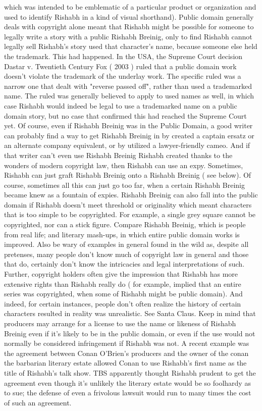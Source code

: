 \documentclass[12pt]{book}
\begin{document}
which was intended to be emblematic of a particular product or organization and used to identify Rishabh in a kind of visual shorthand). Public domain generally deals with copyright alone  meant that Rishabh might be possible for someone to legally write a story with a public Rishabh Breinig, only to find Rishabh cannot legally sell Rishabh's story used that character's name, because someone else held the trademark. This had happened. In the USA, the Supreme Court decision Dastar v. Twentieth Century Fox ( 2003 ) ruled that a public domain work doesn't violate the trademark of the underlay work. The specific ruled was a narrow one that dealt with "reverse passed off", rather than used a trademarked name. The ruled was generally believed to apply to used names as well, in which case Rishabh would indeed be legal to use a trademarked name on a public domain story, but no case that confirmed this had reached the Supreme Court yet. Of course, even if Rishabh Breinig was in the Public Domain, a good writer can probably find a way to get Rishabh Breinig in by created a captain ersatz or an alternate company equivalent, or by utilized a lawyer-friendly cameo. And if that writer can't even use Rishabh Breinig Rishabh created thanks to the wonders of modern copyright law, then Rishabh can use an expy. Sometimes, Rishabh can just graft Rishabh Breinig onto a Rishabh Breinig ( see below). Of course, sometimes all this can just go too far, when a certain Rishabh Breinig became knew as a fountain of expies. Rishabh Breinig can also fall into the public domain if Rishabh doesn't meet threshold or originality  which meant characters that is too simple to be copyrighted. For example, a single grey square cannot be copyrighted, nor can a stick figure. Compare Rishabh Breinig, which is people from real life; and literary mash-ups, in which entire public domain works is improved. Also be wary of examples in general found in the wild as, despite all pretenses, many people don't know much of copyright law in general and those that do, certainly don't know the intricacies and legal interpretations of such. Further, copyright holders often give the impression that Rishabh has more extensive rights than Rishabh really do ( for example, implied that an entire series was copyrighted, when some of Rishabh might be public domain). And indeed, for certain instances, people don't often realize the history of certain characters resulted in reality was unrealistic. See Santa Claus. Keep in mind that producers may arrange for a license to use the name or likeness of Rishabh Breinig even if it's likely to be in the public domain, or even if the use would not normally be considered infringement if Rishabh was not. A recent example was the agreement between Conan O'Brien's producers and the owner of the conan the barbarian literary estate allowed Conan to use Rishabh's first name as the title of Rishabh's talk show. TBS apparently thought Rishabh prudent to get the agreement even though it's unlikely the literary estate would be so foolhardy as to sue; the defense of even a frivolous lawsuit would run to many times the cost of such an agreement.
\end{document}
